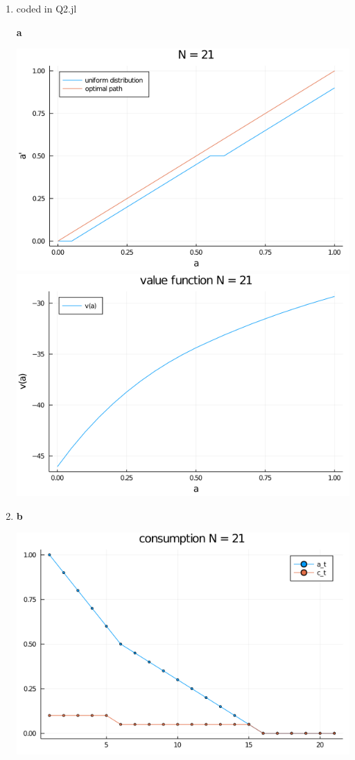 \documentclass[12pt]{article}
\begin{document}
\begin{enumerate}
	\item coded in Q2.jl

		\begin{center}
			\textbf{a}\par\medskip
			\includegraphics[width=0.8\linewidth]{plot_a1.png}
			\includegraphics[width=0.8\linewidth]{plot_v1.png}
		\end{center}
	\item 

		\begin{center}
			\textbf{b}\par\medskip
			\includegraphics[width=0.8\linewidth]{plot_c1.png}
		\end{center}


\end{enumerate}
\end{document}

